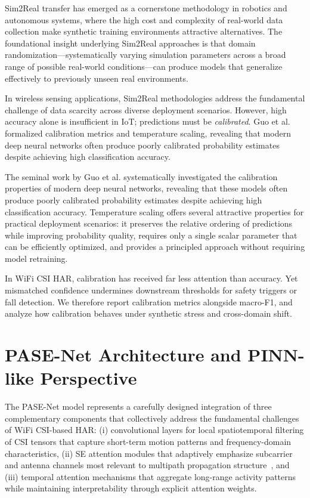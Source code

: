 \documentclass[journal]{IEEEtran}
\begin{document}
Sim2Real transfer has emerged as a cornerstone methodology in robotics and autonomous systems, where the high cost and complexity of real-world data collection make synthetic training environments attractive alternatives. The foundational insight underlying Sim2Real approaches is that domain randomization—systematically varying simulation parameters across a broad range of possible real-world conditions—can produce models that generalize effectively to previously unseen real environments.

In wireless sensing applications, Sim2Real methodologies address the fundamental challenge of data scarcity across diverse deployment scenarios. However, high accuracy alone is insufficient in IoT; predictions must be \emph{calibrated}. Guo et al.~\cite{calibration_guo2017} formalized calibration metrics and temperature scaling, revealing that modern deep neural networks often produce poorly calibrated probability estimates despite achieving high classification accuracy.

The seminal work by Guo et al. systematically investigated the calibration properties of modern deep neural networks, revealing that these models often produce poorly calibrated probability estimates despite achieving high classification accuracy. Temperature scaling offers several attractive properties for practical deployment scenarios: it preserves the relative ordering of predictions while improving probability quality, requires only a single scalar parameter that can be efficiently optimized, and provides a principled approach without requiring model retraining.

In WiFi CSI HAR, calibration has received far less attention than accuracy. Yet mismatched confidence undermines downstream thresholds for safety triggers or fall detection. We therefore report calibration metrics alongside macro-F1, and analyze how calibration behaves under synthetic stress and cross-domain shift.

\section{PASE-Net Architecture and PINN-like Perspective}

The PASE-Net model represents a carefully designed integration of three complementary components that collectively address the fundamental challenges of WiFi CSI-based HAR: (i) convolutional layers for local spatiotemporal filtering of CSI tensors that capture short-term motion patterns and frequency-domain characteristics, (ii) SE attention modules that adaptively emphasize subcarrier and antenna channels most relevant to multipath propagation structure~\cite{se_networks2018}, and (iii) temporal attention mechanisms that aggregate long-range activity patterns while maintaining interpretability through explicit attention weights.
\end{document}
